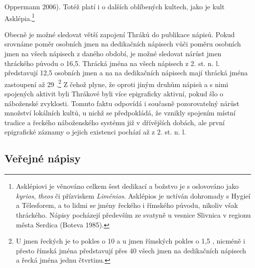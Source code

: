 Oppermann 2006). Totéž platí i o dalších oblíbených kultech, jako je kult Asklépia.\footnote{Asklépiovi je věnováno celkem šest dedikací a božstvo je s oslovováno jako {\em kyrios}, {\em theos} či přízviskem {\em Liménios}. Asklépios je uctíván dohromady s Hygieí a Télesforem, a to lidmi se jmény řeckého i římského původu, nikoliv však thráckého. Nápisy pocházejí především ze svatyně u vesnice Slivnica v regionu města Serdica (Boteva 1985).}

Obecně je možné sledovat větší zapojení Thráků do publikace nápisů. Pokud srovnáme poměr osobních jmen na dedikačních nápisech vůči poměru osobních jmen na všech nápisech z daného období, je možné sledovat nárůst jmen thráckého původu o 16,5. Thrácká jména na všech nápisech z 2. st. n. l. představují 12,5 osobních jmen a na na dedikačních nápisech mají thrácká jména zastoupení až 29 .\footnote{U jmen řeckých je to pokles o 10  a u jmen římských pokles o 1,5 , nicméně i přesto římská jména představují přes 40  všech jmen na dedikačních nápisech a řecká jména jednu čtvrtinu.} Z čehož plyne, že oproti jiným druhům nápisů a s nimi spojených aktivit byli Thrákové byli více epigraficky aktivní, pokud šlo o náboženské zvyklosti. Tomuto faktu odpovídá i současně pozorovatelný nárůst množství lokálních kultů, u nichž se předpokládá, že vznikly spojením místní tradice a řeckého náboženského systému již v dřívějších dobách, ale první epigrafické záznamy o jejich existenci pochází až z 2. st. n. l.

\subsection[veřejné-nápisy-14]{Veřejné nápisy}

